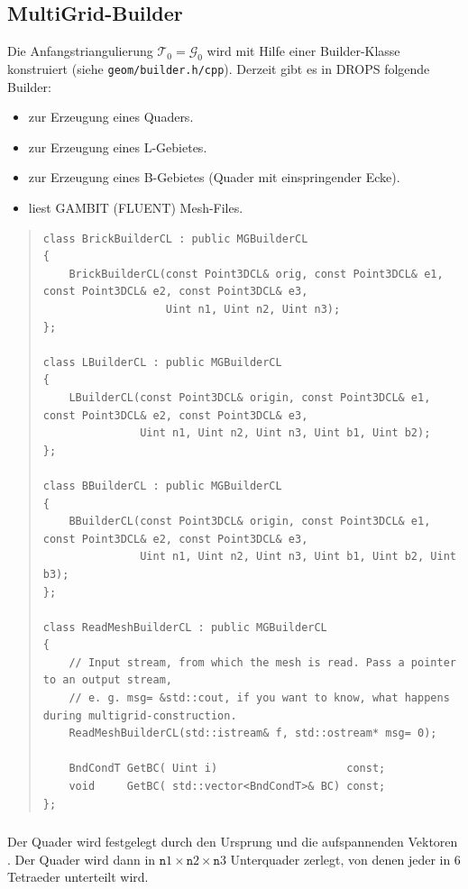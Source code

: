 \documentclass[11pt,a4paper]{article}
\newenvironment{Code}{\begin{quote}\scriptsize}{\end{quote}}
\begin{document}
\subsection{MultiGrid-Builder}
Die Anfangstriangulierung $\mathcal T_0=\mathcal G_0$ wird mit Hilfe einer
Builder-Klasse konstruiert (siehe \verb|geom/builder.h/cpp|). 
Derzeit gibt es in DROPS folgende Builder:
\begin{itemize}
    \item {} zur Erzeugung eines Quaders.
    \item {} zur Erzeugung eines L-Gebietes.
    \item {} zur Erzeugung eines B-Gebietes (Quader mit
    einspringender Ecke).
    \item {} liest GAMBIT (FLUENT) Mesh-Files.
\end{itemize}

\begin{Code}
\begin{verbatim}
class BrickBuilderCL : public MGBuilderCL
{
    BrickBuilderCL(const Point3DCL& orig, const Point3DCL& e1, const Point3DCL& e2, const Point3DCL& e3, 
                   Uint n1, Uint n2, Uint n3);
};

class LBuilderCL : public MGBuilderCL
{
    LBuilderCL(const Point3DCL& origin, const Point3DCL& e1, const Point3DCL& e2, const Point3DCL& e3,
               Uint n1, Uint n2, Uint n3, Uint b1, Uint b2);
};

class BBuilderCL : public MGBuilderCL
{
    BBuilderCL(const Point3DCL& origin, const Point3DCL& e1, const Point3DCL& e2, const Point3DCL& e3,
               Uint n1, Uint n2, Uint n3, Uint b1, Uint b2, Uint b3);
};

class ReadMeshBuilderCL : public MGBuilderCL
{
    // Input stream, from which the mesh is read. Pass a pointer to an output stream,
    // e. g. msg= &std::cout, if you want to know, what happens during multigrid-construction.
    ReadMeshBuilderCL(std::istream& f, std::ostream* msg= 0);

    BndCondT GetBC( Uint i)                    const;
    void     GetBC( std::vector<BndCondT>& BC) const;
};
\end{verbatim}
\end{Code}

\subsubsection{}
Der Quader wird festgelegt durch den Ursprung 
und die aufspannenden Vektoren . Der Quader wird dann in
${\mathtt n1}\times{\mathtt n2}\times{\mathtt n3}$ Unterquader zerlegt, von
denen jeder in 6 Tetraeder unterteilt wird.
\end{document}
